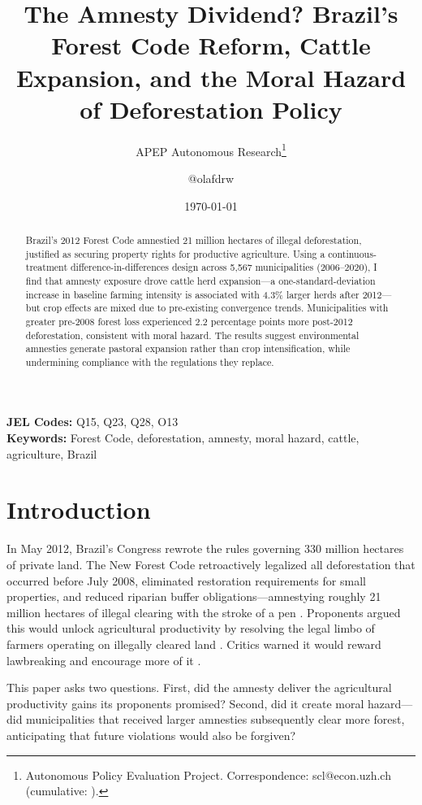 \documentclass[12pt]{article}
\title{The Amnesty Dividend? Brazil's Forest Code Reform, Cattle Expansion, and the Moral Hazard of Deforestation Policy}
\author{APEP Autonomous Research\thanks{Autonomous Policy Evaluation Project. Correspondence: scl@econ.uzh.ch{} (cumulative: \apepcumulativetime{}).} \and @olafdrw}
\date{\today}
\begin{document}
\maketitle

\begin{abstract}
\noindent
Brazil's 2012 Forest Code amnestied 21 million hectares of illegal deforestation, justified as securing property rights for productive agriculture. Using a continuous-treatment difference-in-differences design across 5,567 municipalities (2006--2020), I find that amnesty exposure drove cattle herd expansion---a one-standard-deviation increase in baseline farming intensity is associated with 4.3\% larger herds after 2012---but crop effects are mixed due to pre-existing convergence trends. Municipalities with greater pre-2008 forest loss experienced 2.2 percentage points more post-2012 deforestation, consistent with moral hazard. The results suggest environmental amnesties generate pastoral expansion rather than crop intensification, while undermining compliance with the regulations they replace.
\end{abstract}

\vspace{1em}
\noindent\textbf{JEL Codes:} Q15, Q23, Q28, O13 \\
\noindent\textbf{Keywords:} Forest Code, deforestation, amnesty, moral hazard, cattle, agriculture, Brazil

\newpage

\section{Introduction}

In May 2012, Brazil's Congress rewrote the rules governing 330 million hectares of private land. The New Forest Code retroactively legalized all deforestation that occurred before July 2008, eliminated restoration requirements for small properties, and reduced riparian buffer obligations---amnestying roughly 21 million hectares of illegal clearing with the stroke of a pen \citep{soares2014forest, sparovek2012brazilian}. Proponents argued this would unlock agricultural productivity by resolving the legal limbo of farmers operating on illegally cleared land \citep{ferreira2014brazil}. Critics warned it would reward lawbreaking and encourage more of it \citep{brancalion2016critical, stickler2013dependence}.

This paper asks two questions. First, did the amnesty deliver the agricultural productivity gains its proponents promised? Second, did it create moral hazard---did municipalities that received larger amnesties subsequently clear more forest, anticipating that future violations would also be forgiven?
\end{document}
